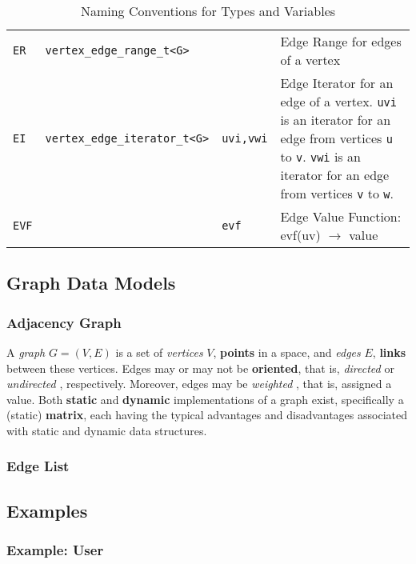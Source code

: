 \documentclass[10pt,onecolumn]{article}
\newcommand{\tcode}[1]{\lstinline[breaklines=true]{#1}}
\begin{document}
\begin{table}[h!]
\begin{center}
{\begin{tabular}{l l l p{7cm}}
    \tcode{ER} &  \tcode{vertex_edge_range_t<G>} & & Edge Range for edges of a vertex \\
    \tcode{EI} & \tcode{vertex_edge_iterator_t<G>} & \tcode{uvi,vwi} & Edge Iterator for an edge of a vertex. \tcode{uvi} is an iterator for an edge from vertices \tcode{u} to \tcode{v}. \tcode{vwi} is an iterator for an edge from vertices \tcode{v} to \tcode{w}. \\
    \tcode{EVF} & & \tcode{evf} & Edge Value Function: evf(uv) $\rightarrow$ value \\
\hline
\end{tabular}}
\caption{Naming Conventions for Types and Variables}
\label{tab:name_conv}
\end{center}
\end{table}

\subsection{Graph Data Models}
\subsubsection{Adjacency Graph}
 A \textit{graph} \cite{REF_graph} $G = (V, E)$ is a set of \textit{vertices} \cite{REF_graph} $V$, \textbf{points} in a space, and \textit{edges} \cite{REF_graph} $E$, \textbf{links} between these vertices. Edges may or may not be \textbf{oriented}, that is, \textit{directed} \cite{REF_graph} or \textit{undirected} \cite{REF_graph}, respectively. Moreover, edges may be \textit{weighted} \cite{REF_graph}, that is, assigned a value. Both \textbf{static} and \textbf{dynamic} implementations of a graph exist, specifically a (static) \textbf{matrix}, each having the typical advantages and disadvantages associated with static and dynamic data structures.


\subsubsection{Edge List}

\subsection{Examples}
\subsubsection{Example: User}
\end{document}
